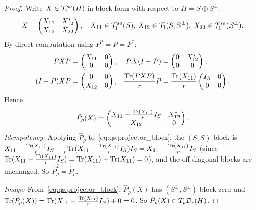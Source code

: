\begin{proof}
Write $X \in \mathcal{T}_{1}^{sa}(H)$ in block form with respect to $H = S \oplus S^\perp$:
\begin{equation*}
    X = \begin{pmatrix} X_{11} & X_{12}^* \\ X_{12} & X_{22}
    \end{pmatrix},
    \quad X_{11} \in \mathcal{T}_{1}^{sa}(S),\; X_{12} \in \mathcal{T}_{1}(S,S^\perp),\;
    X_{22} \in \mathcal{T}_{1}^{sa}(S^\perp).
\end{equation*}
By direct computation using $P^2 = P = P^*$:
\begin{align*}
    PXP &= \begin{pmatrix} X_{11} & 0 \\ 0 & 0 \end{pmatrix}, &
    PX(I-P) &= \begin{pmatrix} 0 & X_{12}^* \\ 0 & 0 \end{pmatrix}, \\
    (I-P)XP &= \begin{pmatrix} 0 & 0 \\ X_{12} & 0 \end{pmatrix}, &
    \frac{\mathrm{Tr}(PXP)}{r}P &= \frac{\mathrm{Tr}(X_{11})}{r}
    \begin{pmatrix} I_S & 0 \\ 0 & 0 \end{pmatrix}.
\end{align*}
Hence
\begin{equation}
\label{eq:qs:projector_block}
    \hat P_\rho(X)
    = \begin{pmatrix} X_{11} - \frac{\mathrm{Tr}(X_{11})}{r}I_S & X_{12}^* \\
    X_{12} & 0 \end{pmatrix}.
\end{equation}
\emph{Idempotency:} Applying $\hat P_\rho$ to~\eqref{eq:qs:projector_block}:
the $(S,S)$ block is $X_{11} - \frac{\mathrm{Tr}(X_{11})}{r}I_S - \frac{1}{r}
\mathrm{Tr}(X_{11} - \frac{\mathrm{Tr}(X_{11})}{r}I_S)I_S = X_{11} - \frac{\mathrm{Tr}(X_{11})}{r}I_S$
(since $\mathrm{Tr}(X_{11} - \frac{\mathrm{Tr}(X_{11})}{r}I_S) = \mathrm{Tr}(X_{11}) - \mathrm{Tr}(X_{11}) = 0$),
and the off-diagonal blocks are unchanged. So $\hat P_\rho^2 = \hat P_\rho$.

\emph{Image:} From~\eqref{eq:qs:projector_block}, $\hat P_\rho(X)$ has
$(S^\perp,S^\perp)$ block zero and $\mathrm{Tr}(\hat P_\rho(X)) = \mathrm{Tr}(X_{11}
- \frac{\mathrm{Tr}(X_{11})}{r}I_S) + 0 = 0$. So $\hat P_\rho(X) \in
T_\rho \mathcal{D}_{r}(H)$.


\end{proof}
